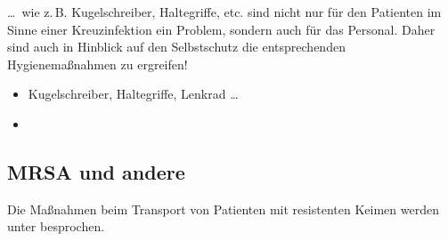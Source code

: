 {%
\ldots\ wie z.\,B. Kugelschreiber, Haltegriffe, etc. sind
nicht nur für den Patienten im Sinne einer Kreuzinfektion
ein Problem, sondern auch für das Personal. Daher sind auch
in Hinblick auf den Selbstschutz die entsprechenden
Hygienemaßnahmen zu ergreifen!
}{
\begin{itemize}
  \item Kugelschreiber, Haltegriffe, Lenkrad \ldots{} 
  \item {}
\end{itemize}

}{}{}{}


\subsection{MRSA und andere }

Die Maßnahmen beim Transport von Patienten mit resistenten Keimen
werden unter  besprochen.




\clearpage%

\subsection{}
\label{topic:nadelstichverletzung}



\cite{Loew200611}





